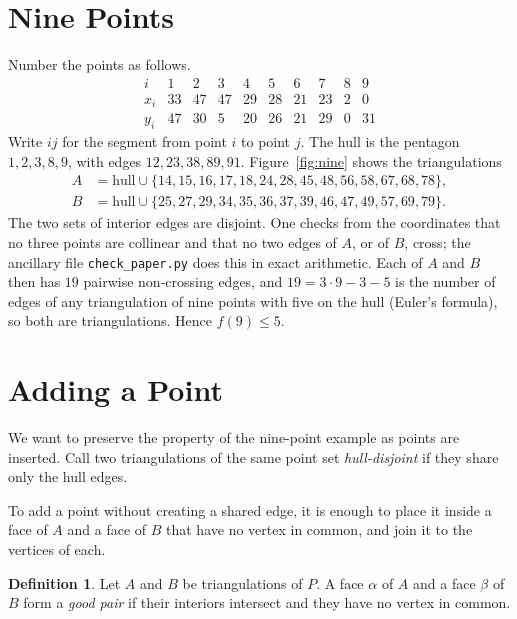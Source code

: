 \documentclass[11pt]{amsart}
\theoremstyle{definition}
\newtheorem{definition}[theorem]{Definition}
\begin{document}
\section{Nine Points}\label{sec:nine}

Number the points as follows.
\[
\begin{array}{c|ccccccccc}
 i & 1 & 2 & 3 & 4 & 5 & 6 & 7 & 8 & 9\\\hline
 x_i & 33 & 47 & 47 & 29 & 28 & 21 & 23 & 2 & 0\\
 y_i & 47 & 30 & 5 & 20 & 26 & 21 & 29 & 0 & 31
\end{array}
\]
Write $ij$ for the segment from point $i$ to point $j$. The hull is the pentagon $1,2,3,8,9$, with edges $12,23,38,89,91$. Figure~\ref{fig:nine} shows the triangulations
\begin{align*}
A&=\text{hull}\cup\{14,15,16,17,18,24,28,45,48,56,58,67,68,78\},\\
B&=\text{hull}\cup\{25,27,29,34,35,36,37,39,46,47,49,57,69,79\}.
\end{align*}
The two sets of interior edges are disjoint. One checks from the coordinates that no three points are collinear and that no two edges of $A$, or of $B$, cross; the ancillary file \texttt{check\_paper.py} does this in exact arithmetic. Each of $A$ and $B$ then has $19$ pairwise non-crossing edges, and $19=3\cdot9-3-5$ is the number of edges of any triangulation of nine points with five on the hull (Euler's formula), so both are triangulations. Hence $f(9)\leq5$.


\section{Adding a Point}\label{sec:insert}

We want to preserve the property of the nine-point example as points are inserted. Call two triangulations of the same point set \emph{hull-disjoint} if they share only the hull edges.

To add a point without creating a shared edge, it is enough to place it inside a face of $A$ and a face of $B$ that have no vertex in common, and join it to the vertices of each.

\begin{definition}
Let $A$ and $B$ be triangulations of $P$. A face $\alpha$ of $A$ and a face $\beta$ of $B$ form a \emph{good pair} if their interiors intersect and they have no vertex in common.
\end{definition}
\end{document}
